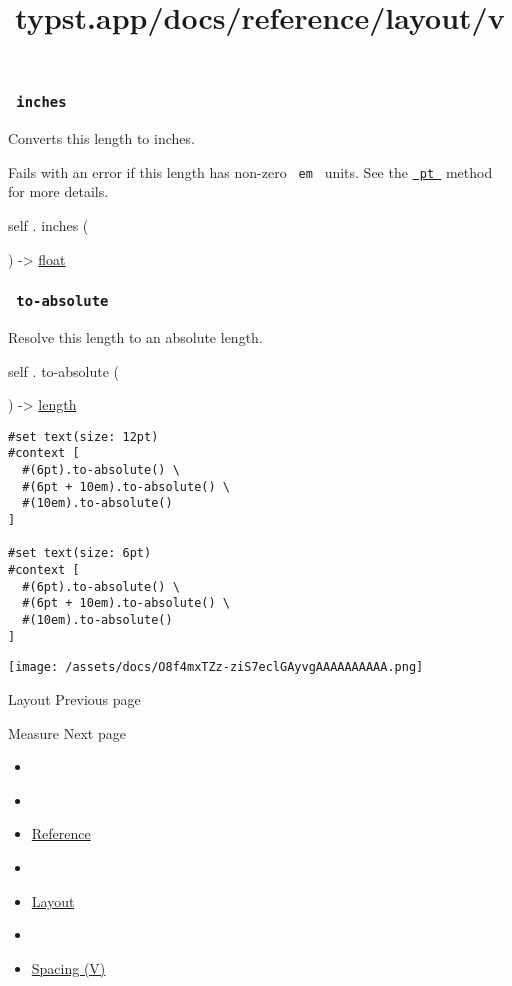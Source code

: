 \subsubsection{\texorpdfstring{\texttt{\ inches\ }}{ inches }}\label{definitions-inches}

Converts this length to inches.

Fails with an error if this length has non-zero \texttt{\ em\ } units.
See the
\href{/docs/reference/layout/length/\#definitions-pt}{\texttt{\ pt\ }}
method for more details.

self { . } { inches } (

) -\textgreater{} \href{/docs/reference/foundations/float/}{float}

\subsubsection{\texorpdfstring{\texttt{\ to-absolute\ }}{ to-absolute }}\label{definitions-to-absolute}

Resolve this length to an absolute length.

self { . } { to-absolute } (

) -\textgreater{} \href{/docs/reference/layout/length/}{length}

\begin{verbatim}
#set text(size: 12pt)
#context [
  #(6pt).to-absolute() \
  #(6pt + 10em).to-absolute() \
  #(10em).to-absolute()
]

#set text(size: 6pt)
#context [
  #(6pt).to-absolute() \
  #(6pt + 10em).to-absolute() \
  #(10em).to-absolute()
]
\end{verbatim}

\texttt{[image: /assets/docs/O8f4mxTZz-ziS7eclGAyvgAAAAAAAAAA.png]}

\href{/docs/reference/layout/layout/}{\pandocbounded{}}

{ Layout } { Previous page }

\href{/docs/reference/layout/measure/}{\pandocbounded{}}

{ Measure } { Next page }


\title{typst.app/docs/reference/layout/v}

\begin{itemize}
\tightlist
\item
  \href{/docs}{}
\item
  
\item
  \href{/docs/reference/}{Reference}
\item
  
\item
  \href{/docs/reference/layout/}{Layout}
\item
  
\item
  \href{/docs/reference/layout/v/}{Spacing (V)}
\end{itemize}

